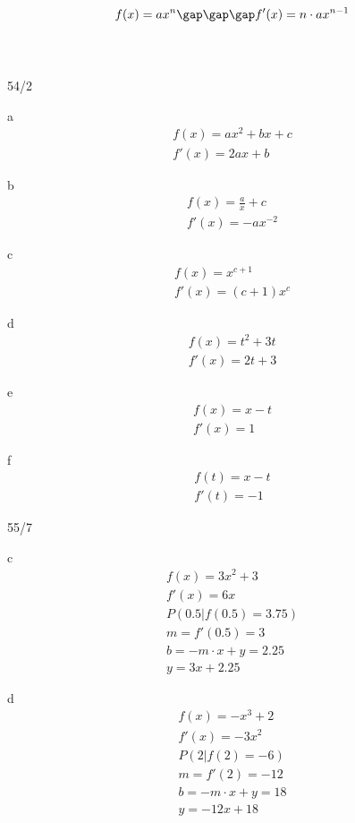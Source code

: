 $$f(x) = ax^n \gap\gap\gap f'(x) = n \cdot ax^{n-1}$$ \\\\
\newpage
\begin{exercise}{54/2}
  \item [a]
  \begin{gather*}
    f(x) = ax^2 + bx + c \\
    f'(x) = 2ax + b
  \end{gather*}
  \item [b]
  \begin{gather*}
    f(x) = \frac{a}{x} + c \\
    f'(x) = -ax^{-2}
  \end{gather*}
  \item [c]
  \begin{gather*}
    f(x) = x^{c + 1} \\
    f'(x) = (c + 1)x^c
  \end{gather*}
  \item [d]
  \begin{gather*}
    f(x) = t^2 + 3t \\
    f'(x) = 2t + 3
  \end{gather*}
  \item [e]
  \begin{gather*}
    f(x) = x - t \\
    f'(x) = 1
  \end{gather*}
  \item [f]
  \begin{gather*}
    f(t) = x - t \\
    f'(t) = -1
  \end{gather*}
\end{exercise}
\begin{exercise}{55/7}
  \item [c]
  \begin{gather*}
    f(x) = 3x^2 + 3 \\
    f'(x) = 6x \\
    P(0.5 | f(0.5) = 3.75) \\
    m = f'(0.5) = 3 \\
    b = -m \cdot x + y = 2.25 \\
    y = 3x + 2.25
  \end{gather*}
  \item [d]
  \begin{gather*}
    f(x) = -x^3 + 2 \\
    f'(x) = -3x^2 \\
    P(2 | f(2) = -6) \\
    m = f'(2) = -12 \\
    b = -m \cdot x + y = 18 \\
    y = -12x + 18
  \end{gather*}
\end{exercise}
